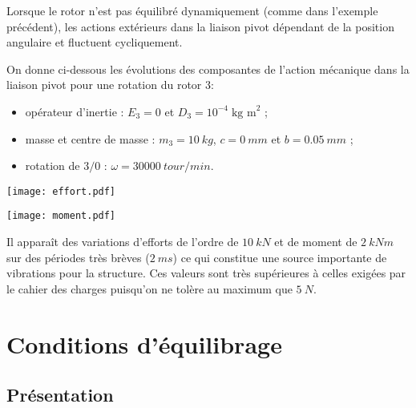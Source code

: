 \begin{prop}
Lorsque le rotor n'est pas équilibré dynamiquement (comme dans l'exemple précédent), les actions extérieurs dans la liaison pivot dépendant de la position angulaire et fluctuent cycliquement.

On donne ci-dessous les évolutions des composantes de l'action mécanique dans la liaison pivot pour une rotation du rotor 3:
\begin{itemize}
\item opérateur d'inertie : $E_3=0$ et $D_3=10^{-4}\;\text{kg m}^2$ ; 
\item masse et centre de masse : $m_3=\SI{10}{kg}$, $c=\SI{0}{mm}$ et $b=\SI{0,05}{mm}$ ; 
\item rotation de $3/0$ : $\omega=\SI{30000}{tour/min}$.
\end{itemize}

\begin{center}

\begin{minipage}{0.45\textwidth}
\begin{center}
\texttt{[image: effort.pdf]}
\end{center}
\end{minipage}
\begin{minipage}{0.45\textwidth}
\begin{center}
\texttt{[image: moment.pdf]}
\end{center}
\end{minipage}
\end{center}

Il apparaît des variations d'efforts de l'ordre de $\SI{10}{kN}$ et de moment de $\SI{2}{kN m}$ sur des périodes très brèves ($\SI{2}{ms}$) ce qui constitue une source importante de vibrations pour la structure. Ces valeurs sont très supérieures à celles exigées par le cahier des charges puisqu'on ne tolère au maximum que $\SI{5}{N}$.
\end{prop}

\section{Conditions d'équilibrage}

\subsection{Présentation}

